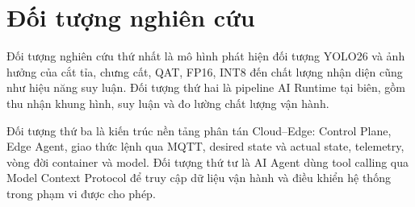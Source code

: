 \section{Đối tượng nghiên cứu}

Đối tượng nghiên cứu thứ nhất là mô hình phát hiện đối tượng YOLO26 và ảnh
hưởng của cắt tỉa, chưng cất, QAT, FP16, INT8 đến chất lượng nhận diện cũng như
hiệu năng suy luận. Đối tượng thứ hai là pipeline AI Runtime tại biên, gồm thu
nhận khung hình, suy luận và đo lường chất lượng vận hành.

Đối tượng thứ ba là kiến trúc nền tảng phân tán Cloud--Edge: Control Plane, Edge
Agent, giao thức lệnh qua MQTT, desired state và actual state, telemetry, vòng
đời container và model. Đối tượng thứ tư là AI Agent dùng tool calling qua Model
Context Protocol để truy cập dữ liệu vận hành và điều khiển hệ thống trong phạm
vi được cho phép.
